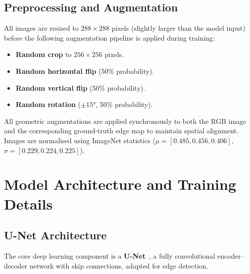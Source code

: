 \documentclass[12pt, a4paper]{article}
\begin{document}
\subsection{Preprocessing and Augmentation}

All images are resized to $288 \times 288$ pixels (slightly larger than the model input) before the following augmentation pipeline is applied during training:

\begin{itemize}[nosep]
    \item \textbf{Random crop} to $256 \times 256$ pixels.
    \item \textbf{Random horizontal flip} (50\% probability).
    \item \textbf{Random vertical flip} (50\% probability).
    \item \textbf{Random rotation} ($\pm 15°$, 50\% probability).
\end{itemize}

All geometric augmentations are applied synchronously to both the RGB image and the corresponding ground-truth edge map to maintain spatial alignment.
Images are normalised using ImageNet statistics ($\mu = [0.485, 0.456, 0.406]$, $\sigma = [0.229, 0.224, 0.225]$).

\section{Model Architecture and Training Details}

\subsection{U-Net Architecture}

The core deep learning component is a \textbf{U-Net}~\cite{ronneberger2015unet}, a fully convolutional encoder--decoder network with skip connections, adapted for edge detection.
\end{document}
